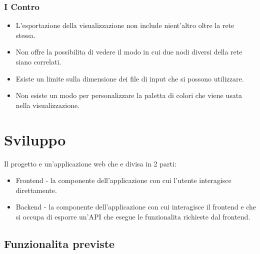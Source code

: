 \documentclass[a4paper,12pt]{report}
\begin{document}
			\subsubsection*{I Contro}
				\begin{itemize}
					\item L'esportazione della visualizzazione non include nient'altro oltre la rete stessa.
					\item Non offre la possibilita di vedere il modo in cui due nodi diversi della rete siano correlati.
					\item Esiste un limite sulla dimensione dei file di input che si possono utilizzare.
					\item Non esiste un modo per personalizzare la paletta di colori che viene usata nella visualizzazione.
				\end{itemize}

	\section{Sviluppo}
		Il progetto e un'applicazione web che e divisa in 2 parti:
		\begin{itemize}
		\item Frontend - la componente dell'applicazione con cui l'utente interagisce direttamente.
		\item Backend - la componente dell'applicazione con cui interagisce il frontend e che si occupa di esporre un'API che esegue le funzionalita richieste dal frontend.
		\end{itemize}
		\subsection{Funzionalita previste}
\end{document}
